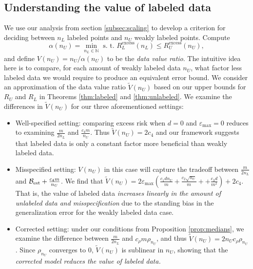 \subsection{Understanding the value of labeled data}
We use our analysis from section \ref{subsec:scaling} to develop a criterion for deciding between $n_L$ labeled points and $n_U$ weakly labeled points. Compute
\[\alpha(n_U) = \min_{n_L \in \mathbb{N}} \text{ s. t. } R_L^{\mathrm{excess}}(n_L) \le R_U^{\mathrm{excess}}(n_U),\]
and define
$V(n_U) = {n_U}/\alpha(n_U)$
to be the \textit{data value ratio}. The intuitive idea here is to compare, for each amount of weakly labeled data $n_U$, what factor less labeled data we would require to produce an equivalent error bound. We consider an approximation of the data value ratio $\widetilde{V}(n_U)$ based on our upper bounds for $R_U$ and $R_L$ in Theorems \ref{thm:labeled} and \ref{thm:unlabeled}. We examine the differences in $\widetilde{V}(n_U)$ for our three aforementioned settings:
\begin{itemize}
    \item Well-specified setting: comparing excess risk when $d = 0$ and $\varepsilon_{\max} = 0$ reduces to examining $\frac{m}{2n_L}$ and $\frac{c_4 m}{n_U}$. Thus $\widetilde{V}(n_U) = 2c_4$ and our framework suggests that labeled data is only a constant factor more beneficial than weakly labeled data.
    \item Misspecified setting: $V(n_U)$ in this case will capture the tradeoff between $\frac{m}{2n_L}$ and $\mathcal{B}_{\mathrm{est}} + \frac{c_4 m }{n_U}$. We find that $\widetilde{V}(n_U) = 2 \varepsilon_{\max} \left(\frac{c_1 dn_U}{m} + \frac{c_2 \sqrt{n_U}}{m} + +\frac{c_3 d}{m^2} \right) + 2 c_4$. That is, the value of labeled data \textit{increases linearly in the amount of unlabeled data and misspecification} due to the standing bias in the generalization error for the weakly labeled data case.  
    \item Corrected setting: under our conditions from Proposition \ref{prop:medians}, we examine the difference between $\frac{m}{2n_L}$ and $ c_\rho m \rho_{n_
    U}$, and thus $\widetilde{V}(n_U) = 2n_U c_{\rho} \rho_{n_U}$. Since $\rho_{n_U}$ converges to $0$, $\widetilde{V}(n_U)$ is sublinear in $n_U$, showing that the \textit{corrected model reduces the value of labeled data.}
\end{itemize}

